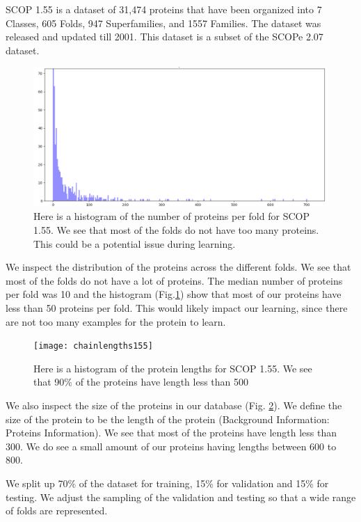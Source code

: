 \documentclass[12pt, a4paper, twocolumn, fullpage]{article}
\theoremstyle{plain}
\theoremstyle{definition}
\theoremstyle{remark}
\begin{document}
SCOP 1.55 is a dataset of 31,474 proteins that have been organized into 7 Classes, 605 Folds, 947 Superfamilies, and 1557 Families. The dataset was released and updated till 2001. This dataset is a subset of the SCOPe 2.07 dataset.


\begin{figure}
    \includegraphics[width=\linewidth]{num_proteins_fold_155}
    \caption{Here is a histogram of the number of proteins per fold for SCOP 1.55. We see that most of the folds do not have too many proteins. This could be a potential issue during learning.}
    \label{num_proteins_fold_155}
\end{figure}

We inspect the distribution of the proteins across the different folds. We see that most of the folds do not have a lot of proteins. The median number of proteins per fold was 10 and the histogram (Fig.\ref{num_proteins_fold_155}) show that most of our proteins have less than 50 proteins per fold. This would likely impact our learning, since there are not too many examples for the protein to learn.


\begin{figure}
    \texttt{[image: chainlengths155]}
    \caption{Here is a histogram of the protein lengths for SCOP 1.55. We see that 90\% of the proteins have length less than 500}
    \label{chainlengths155}
\end{figure}

We also inspect the size of the proteins in our database (Fig. \ref{chainlengths155}). We define the size of the protein to be the length of the protein (Background Information: Proteins Information). We see that most of the proteins have length less than 300. We do see a small amount of our proteins having lengths between 600 to 800. 

We split up 70\% of the dataset for training, 15\% for validation and 15\% for testing. We adjust the sampling of the validation and testing so that a wide range of folds are represented.
\end{document}

